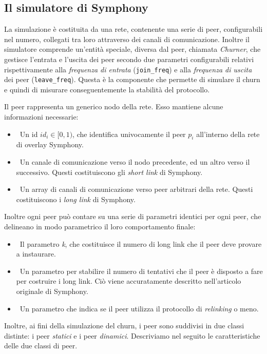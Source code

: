 \documentclass[prodmode,acmtap]{acmlarge}
\begin{document}
\subsection{Il simulatore di Symphony}

La simulazione è costituita da una rete, contenente una serie di peer, configurabili nel numero, collegati tra loro attraverso dei canali di comunicazione. Inoltre il simulatore comprende un'entità speciale, diversa dal peer, chiamata \emph{Churner}, che gestisce l'entrata e l'uscita dei peer secondo due parametri configurabili relativi rispettivamente alla \emph{frequenza di entrata} (\texttt{join\_freq}) e alla \emph{frequenza di uscita} dei peer (\texttt{leave\_freq}). Questa è la componente che permette di simulare il churn e quindi di misurare conseguentemente la stabilità del protocollo.

Il peer rappresenta un generico nodo della rete. Esso mantiene alcune informazioni necessarie:
\begin{itemize}
	\item ~Un id $id_i \in [0,1)$, che identifica univocamente il peer $p_i$ all'interno della rete di overlay Symphony.
	\item ~Un canale di comunicazione verso il nodo precedente, ed un altro verso il successivo. Questi costituiscono gli \textit{short link} di Symphony.
	\item ~Un array di canali di comunicazione verso peer arbitrari della rete. Questi costituiscono i \textit{long link} di Symphony.
\end{itemize}

Inoltre ogni peer può contare su una serie di parametri identici per ogni peer, che delineano in modo parametrico il loro comportamento finale:
\begin{itemize}
	\item ~Il parametro \textit{k}, che costituisce il numero di long link che il peer deve provare a instaurare.
	\item ~Un parametro per stabilire il numero di tentativi che il peer è disposto a fare per costruire i long link. Ciò viene accuratamente descritto nell'articolo originale di Symphony.
	\item ~Un parametro che indica se il peer utilizza il protocollo di \emph{relinking} o meno.
\end{itemize}

Inoltre, ai fini della simulazione del churn, i peer sono suddivisi in due classi distinte: i peer \emph{statici} e i peer \emph{dinamici}. Descriviamo nel seguito le caratteristiche delle due classi di peer.
\end{document}
